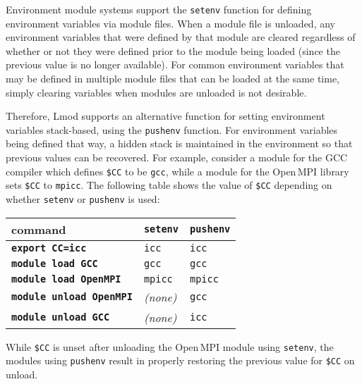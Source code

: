 Environment module systems support the \texttt{\small setenv} function for 
defining environment variables via module files. When a module file is unloaded,
any environment variables that were defined by that module are cleared regardless
of whether or not they were defined prior to the module being loaded (since the
previous value is no longer available). For common environment variables that may
be defined in multiple module files that can be loaded at the same time, simply
clearing variables when modules are unloaded is not desirable.

Therefore, Lmod supports an alternative function for setting environment variables
stack-based, using the \texttt{\small pushenv} function. For environment
variables being defined that way, a hidden stack is maintained in the environment
so that previous values can be recovered.
For example, consider a module for the GCC compiler which
defines \texttt{\small \$CC} to be \texttt{\small gcc}, while a module for the
Open\,MPI library sets \texttt{\small \$CC} to
\texttt{\small mpicc}. The following table shows the value of \texttt{\small \$CC}
depending on whether \texttt{\small setenv} or \texttt{\small pushenv} is used:
\begin{center}
 \begin{tabular}{l|l|l}
 command                                 & \texttt{\small setenv} & \texttt{\small pushenv}\\
 \hline
 \textbf{\texttt{\small export CC=icc}}  & \texttt{\small icc}  & \texttt{\small icc} \\
 \textbf{\texttt{\small module load   GCC}}   & \texttt{\small gcc}    & \texttt{\small gcc}  \\
 \textbf{\texttt{\small module load   OpenMPI}} & \texttt{\small mpicc}  & \texttt{\small mpicc} \\
 \textbf{\texttt{\small module unload OpenMPI}} & \emph{(none)}   & \texttt{\small gcc}  \\
 \textbf{\texttt{\small module unload GCC}}   & \emph{(none)}   & \texttt{\small icc} \\
  \hline
    \end{tabular}
\end{center}
\noindent
While \texttt{\small\$CC} is unset after unloading the Open\,MPI module
using \texttt{\small setenv}, the modules using \texttt{\small pushenv} result
in properly restoring the previous value for \texttt{\small\$CC} on unload.



